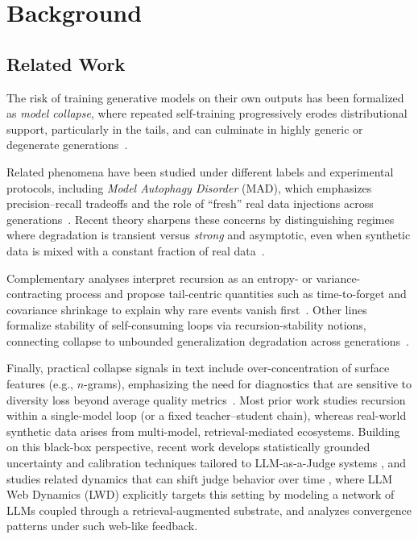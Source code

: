 \documentclass{article}
\theoremstyle{plain}
\theoremstyle{definition}
\theoremstyle{remark}
\begin{document}
\section{Background}

\subsection{Related Work}
The risk of training generative models on their own outputs has been formalized as \emph{model collapse}, where repeated self-training progressively erodes distributional support, particularly in the tails, and can culminate in highly generic or degenerate generations~\cite{shumailov2024,Shumailov2024-dj}.

Related phenomena have been studied under different labels and experimental protocols, including \emph{Model Autophagy Disorder} (MAD), which emphasizes precision--recall tradeoffs and the role of ``fresh'' real data injections across generations~\cite{alemohammad2023selfconsuminggenerativemodelsmad}.
Recent theory sharpens these concerns by distinguishing regimes where degradation is transient versus \emph{strong} and asymptotic, even when synthetic data is mixed with a constant fraction of real data~\cite{dohmatob2024strongmodelcollapse}.

Complementary analyses interpret recursion as an entropy- or variance-contracting process and propose tail-centric quantities such as time-to-forget and covariance shrinkage to explain why rare events vanish first~\cite{seddik2024badtrainingsyntheticdata}. Other lines formalize stability of self-consuming loops via recursion-stability notions, connecting collapse to unbounded generalization degradation across generations~\cite{yoon2025modelcollapseselfconsumingchain}.

Finally, practical collapse signals in text include over-concentration of surface features (e.g., $n$-grams), emphasizing the need for diagnostics that are sensitive to diversity loss beyond average quality metrics~\cite{zhu2025synthesizetextdatamodel}. Most prior work studies recursion within a single-model loop (or a fixed teacher--student chain), whereas real-world synthetic data arises from multi-model, retrieval-mediated ecosystems. Building on this black-box perspective, recent work develops statistically grounded uncertainty and calibration techniques tailored to LLM-as-a-Judge systems \cite{pang2025unsupervisedconformal,pang2025tamingvariability}, and studies related dynamics that can shift judge behavior over time \cite{wang2025llmwebdynamicstracing}, where
LLM Web Dynamics (LWD) explicitly targets this setting by modeling a network of LLMs coupled through a retrieval-augmented substrate, and analyzes convergence patterns under such web-like feedback.
\end{document}
